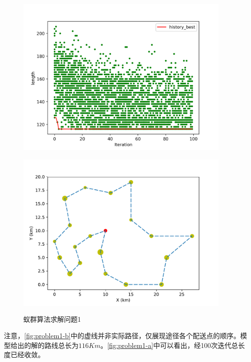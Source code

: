 \documentclass{cumcmthesis}
\begin{document}
    \begin{figure}[h]
        \centering
        \begin{minipage}[c]{0.45\textwidth}
            \centering
            \includegraphics[width=0.95\textwidth]{figure/optimize_process.png}
            \label{fig:problem1-a}
        \end{minipage}
        \begin{minipage}[c]{0.45\textwidth}
            \centering
            \includegraphics[width=0.95\textwidth]{figure/path_TS.pdf}
            \label{fig:problem1-b}
        \end{minipage}
        \caption{蚁群算法求解问题1}
        \label{fig:problem1}
    \end{figure}
    注意，\cref{fig:problem1-b}中的虚线并非实际路径，仅展现途径各个配送点的顺序。模型给出的解的路线总长为$116Km$。\cref{fig:problem1-a}中可以看出，经100次迭代总长度已经收敛。
\end{document}
